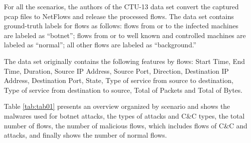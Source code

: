 \documentclass[review]{elsarticle}
\begin{document}
For all the scenarios, the authors of the CTU-13 data set convert the captured pcap files to NetFlows and release the processed flows. The data set contains ground-truth labels for flows as follows: flows from or to the infected machines are labeled as “botnet”; flows from or to well known and controlled machines are labeled as “normal”; all other flows are labeled as “background.”

The data set originally contains the following features by flows:  Start Time, End Time, Duration, Source IP Address, Source Port, Direction, Destination IP Address, Destination Port, State, Type of service from source to destination, Type of service from destination to source, Total of Packets and Total of Bytes.

Table \ref{tab:tab01} presents an overview organized by scenario and shows the malwares used for botnet attacks, the types of attacks and C\&C types, the total number of flows, the number of malicious flows, which includes flows of C\&C and attacks, and finally shows the number of normal flows.
\end{document}
